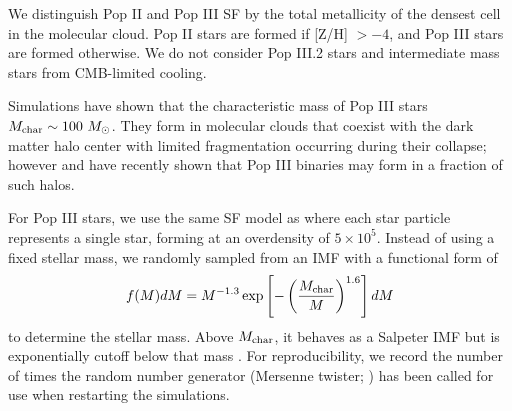 \documentclass[apjl]{emulateapj}
\newcommand{\Ms}{\ifmmode{M_\odot}\else{$M_\odot$}\fi}
\begin{document}

We distinguish Pop II and Pop III SF by the total metallicity of the
densest cell in the molecular cloud.  Pop II stars are formed if [Z/H]
$> -4$, and Pop III stars are formed otherwise.  We do not consider
Pop III.2 stars and intermediate mass stars from CMB-limited cooling.

Simulations have shown that the characteristic mass of Pop III stars
$M_{\rm char} \sim 100~\Ms$.  They form in molecular clouds that
coexist with the dark matter halo center with limited fragmentation
occurring during their collapse; however \citet{2009Sci...325..601T}
and \citet{Stacy10_Binary} have recently shown that Pop III binaries
may form in a fraction of such halos.


For Pop III stars, we use the same SF model as \citet{Wise08_Gal} where
each star particle represents a single star, forming at an overdensity
of $5 \times 10^5$.  Instead of using a fixed stellar mass, we randomly
sampled from an IMF with a functional form of
%
\begin{equation}
\label{eqn:imf}
f(M)dM = M^{-1.3} \exp\left[-\left(\frac{M_{\rm
      char}}{M}\right)^{1.6}\right] dM
\end{equation}
to determine the stellar mass.  Above $M_{\rm char}$, it behaves as a
Salpeter IMF but is exponentially cutoff below that mass
\citep{Chabrier03, Clark09}.  For reproducibility, we record the number
of times the random number generator (Mersenne twister;
\citet{MTwister}) has been called for use when restarting the
simulations.

%
\end{document}
